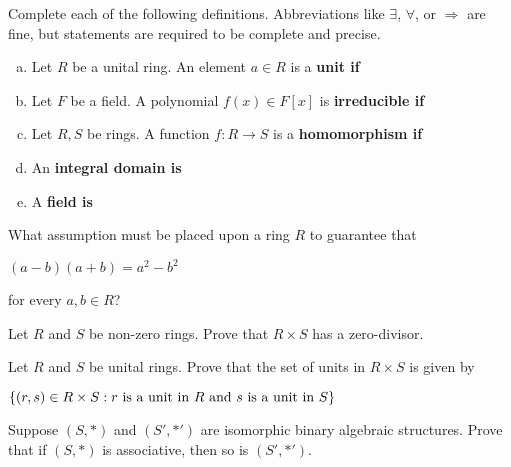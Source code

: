 \documentclass[11pt]{exam}
\begin{document}
\newpage %

%
%
%

\begin{questions}
\question[10] Complete each of the following definitions.  Abbreviations like $\exists$, $\forall$, or $\Rightarrow$ are fine, but statements are required to be complete and precise.
\begin{enumerate}[(a)]
\item Let $R$ be a unital ring.  An element $a\in R$ is a \bf unit \md if
\vfill

\item Let $F$ be a field.  A polynomial $f(x)\in F[x]$ is \bf irreducible \md if 
\vfill

\item Let $R,S$ be rings.  A function $f:R\to S$ is a \bf homomorphism \md if
\vfill

\item An \bf integral domain \md is
\vfill

\item A \bf field \md is
\vfill

\end{enumerate}
\newpage


\question[5] What assumption must be placed upon a ring $R$ to guarantee that
\begin{center}
$(a-b)(a+b) = a^2 - b^2$
\end{center}
for every $a,b\in R$?
\newpage

\question[3] Let $R$ and $S$ be non-zero rings.  Prove that $R\times S$ has a zero-divisor.
\newpage

\question[5] Let $R$ and $S$ be unital rings.  Prove that the set of units in $R\times S$ is given by
\begin{center}
$\left\{(r,s)\in R\times S:r\text{ is a unit in }R\text{ and }s\text{ is a unit in }S\right\}$
\end{center} 
\newpage

\question[3] Suppose $(S,*)$ and $(S',*')$ are isomorphic binary algebraic structures.  Prove that if $(S,*)$ is associative, then so is $(S',*')$.
\vfill
\newpage


\end{questions}
\end{document}

